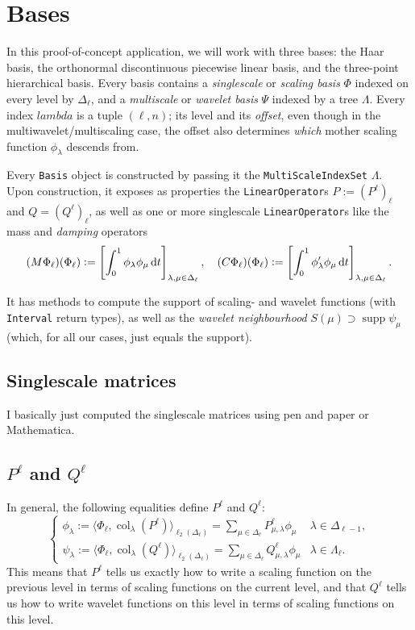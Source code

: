 \documentclass[11pt,a4paper]{amsart}
\theoremstyle{definition}
\DeclareMathOperator{\supp}{supp}
\DeclareMathOperator{\col}{col}
\begin{document}
\section{Bases}
In this proof-of-concept application, we will work with three bases: the Haar
basis, the orthonormal discontinuous piecewise linear basis, and the three-point
hierarchical basis. Every basis contains a \emph{singlescale} or \emph{scaling
basis} $\Phi$ indexed on every level by $\Delta_\ell$, and a \emph{multiscale}
or \emph{wavelet basis} $\Psi$ indexed by a tree $\Lambda$. Every index $lambda$
is a tuple $(\ell, n)$; its level and its \emph{offset}, even though in the
multiwavelet/multiscaling case, the offset also determines \emph{which} mother
scaling function $\phi_\lambda$ descends from.

Every \texttt{Basis} object is constructed by passing it the \texttt{MultiScaleIndexSet}
$\Lambda$. Upon construction, it exposes as properties the \texttt{LinearOperator}s
$P := (P^\ell)_{\ell}$ and $Q = (Q^\ell)_\ell$, as well as one or more singlescale
\texttt{LinearOperator}s like the mass and \emph{damping} operators
\[
  (M\Phi_\ell)(\Phi_\ell) := \left[\int_0^1 \phi_\lambda \phi_\mu \dif t \right]_{\lambda,\mu \in \Delta_\ell}, \quad
  (C\Phi_\ell)(\Phi_\ell) := \left[\int_0^1 \phi_\lambda' \phi_\mu \dif t \right]_{\lambda,\mu \in \Delta_\ell}.
\]

It has methods to compute the support of scaling- and wavelet functions (with
\texttt{Interval} return types), as well as the \emph{wavelet neighbourhood}
$S(\mu) \supset \supp \psi_\mu$ (which, for all our cases, just equals the support).

\subsection{Singlescale matrices}
I basically just computed the singlescale matrices using pen and paper or
Mathematica.

\subsection{$P^\ell$ and $Q^\ell$}
In general, the following equalities define $P^\ell$ and $Q^\ell$:
\[
\begin{cases}
  \phi_\lambda := \langle\Phi_\ell, \col_\lambda(P^\ell)\rangle_{\ell_2(\Delta_\ell)} = \sum_{\mu \in \Delta_\ell} P^\ell_{\mu,\lambda} \phi_\mu & \lambda \in \Delta_{\ell-1},\\
  \psi_\lambda := \langle \Phi_{\ell}, \col_\lambda(Q^\ell)\rangle_{\ell_2(\Delta_\ell)} = \sum_{\mu \in \Delta_\ell} Q^\ell_{\mu,\lambda} \phi_\mu & \lambda \in \Lambda_\ell.
\end{cases}
\]
This means that $P^\ell$ tells us exactly how to write a scaling function on the
previous level in terms of scaling functions on the current level, and that $Q^\ell$
tells us how to write wavelet functions on this level in terms of scaling functions
on this level.
\end{document}
